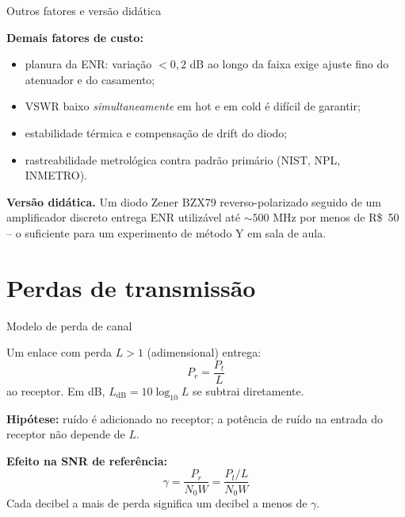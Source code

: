 
\begin{frame}{Outros fatores e versão didática}

\textbf{Demais fatores de custo:}
\begin{itemize}
\item planura da ENR: variação $< 0{,}2$ dB ao longo da faixa exige ajuste fino do atenuador e do casamento;
\item VSWR baixo \emph{simultaneamente} em hot e em cold é difícil de garantir;
\item estabilidade térmica e compensação de drift do diodo;
\item rastreabilidade metrológica contra padrão primário (NIST, NPL, INMETRO).
\end{itemize}

\textbf{Versão didática.} Um diodo Zener BZX79 reverso-polarizado seguido de um amplificador discreto entrega ENR utilizável até $\sim 500$ MHz por menos de R\$~50 -- o suficiente para um experimento de método Y em sala de aula.

\end{frame}


\section{Perdas de transmissão}

\begin{frame}{Modelo de perda de canal}

Um enlace com perda $L > 1$ (adimensional) entrega:
\[
P_r = \frac{P_t}{L}
\]
ao receptor. Em dB, $L_{\text{dB}} = 10\log_{10} L$ se subtrai diretamente.

\vspace{0.3cm}

\textbf{Hipótese:} ruído é adicionado no receptor; a potência de ruído na entrada do receptor não depende de $L$.

\vspace{0.3cm}

\textbf{Efeito na SNR de referência:}
\[
\gamma = \frac{P_r}{N_0 W} = \frac{P_t / L}{N_0 W}
\]
Cada decibel a mais de perda significa um decibel a menos de $\gamma$.

\end{frame}


